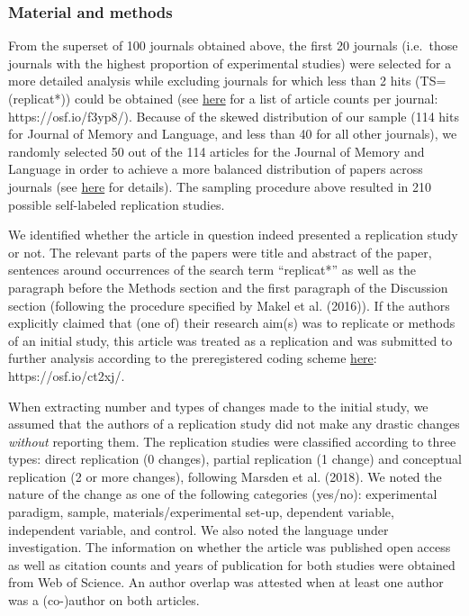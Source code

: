 \documentclass[]{elsarticle} %
\begin{document}
\hypertarget{material-and-methods-1}{%
\subsubsection{Material and methods}\label{material-and-methods-1}}

From the superset of 100 journals obtained above, the first 20 journals
(i.e.~those journals with the highest proportion of experimental
studies) were selected for a more detailed analysis while excluding
journals for which less than 2 hits (TS=(replicat*)) could be obtained
(see \href{https://osf.io/f3yp8/}{here} for a list of article counts per
journal: https://osf.io/f3yp8/). Because of the skewed distribution of
our sample (114 hits for Journal of Memory and Language, and less than
40 for all other journals), we randomly selected 50 out of the 114
articles for the Journal of Memory and Language in order to achieve a
more balanced distribution of papers across journals (see
\href{https://osf.io/6vfpe/}{here} for details). The sampling procedure
above resulted in 210 possible self-labeled replication studies.

We identified whether the article in question indeed presented a
replication study or not. The relevant parts of the papers were title
and abstract of the paper, sentences around occurrences of the search
term ``replicat*'' as well as the paragraph before the Methods section
and the first paragraph of the Discussion section (following the
procedure specified by Makel et al. (2016)). If the authors explicitly
claimed that (one of) their research aim(s) was to replicate or methods
of an initial study, this article was treated as a replication and was
submitted to further analysis according to the preregistered coding
scheme \href{https://osf.io/ct2xj/}{here}: https://osf.io/ct2xj/.

When extracting number and types of changes made to the initial study,
we assumed that the authors of a replication study did not make any
drastic changes \emph{without} reporting them. The replication studies
were classified according to three types: direct replication (0
changes), partial replication (1 change) and conceptual replication (2
or more changes), following Marsden et al. (2018). We noted the nature
of the change as one of the following categories (yes/no): experimental
paradigm, sample, materials/experimental set-up, dependent variable,
independent variable, and control. We also noted the language under
investigation. The information on whether the article was published open
access as well as citation counts and years of publication for both
studies were obtained from Web of Science. An author overlap was
attested when at least one author was a (co-)author on both articles.
\end{document}
